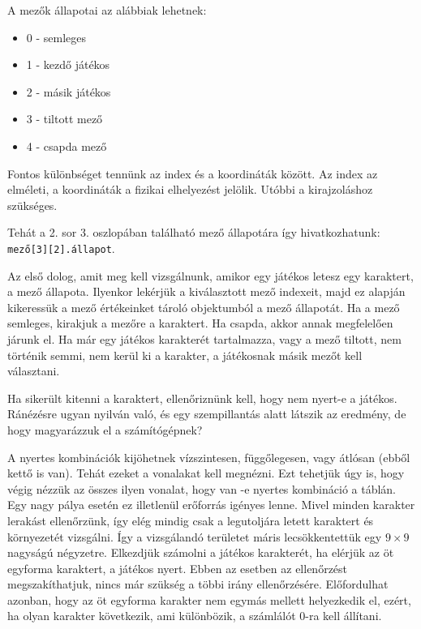 A mezők állapotai az alábbiak lehetnek:
\begin{itemize}	
	\item 0 - semleges
	\item 1 - kezdő játékos
	\item 2 - másik játékos
	\item 3 - tiltott mező
	\item 4 - csapda mező
\end{itemize}

Fontos különbséget tennünk az index és a koordináták között. Az index az elméleti, a koordináták a fizikai elhelyezést jelölik. Utóbbi a kirajzoláshoz szükséges.

Tehát a 2. sor 3. oszlopában található mező állapotára így hivatkozhatunk: \\
\texttt{mező[3][2].állapot}.


Az első dolog, amit meg kell vizsgálnunk, amikor egy játékos letesz egy karaktert, a mező állapota. Ilyenkor lekérjük a kiválasztott mező indexeit, majd ez alapján kikeressük a mező értékeinket tároló objektumból a mező állapotát. Ha a mező semleges, kirakjuk a mezőre a karaktert. Ha csapda, akkor annak megfelelően járunk el. Ha már egy játékos karakterét tartalmazza, vagy a mező tiltott, nem történik semmi, nem kerül ki a karakter, a játékosnak másik mezőt kell választani.

Ha sikerült kitenni a karaktert, ellenőriznünk kell, hogy nem nyert-e a játékos. Ránézésre ugyan nyilván való, és egy szempillantás alatt látszik az eredmény, de hogy magyarázzuk el a számítógépnek?

A nyertes kombinációk kijöhetnek vízszintesen, függőlegesen, vagy átlósan (ebből kettő is van). Tehát ezeket a vonalakat kell megnézni. Ezt tehetjük úgy is, hogy végig nézzük az összes ilyen vonalat, hogy van -e nyertes kombináció a táblán. Egy nagy pálya esetén ez illetlenül erőforrás igényes lenne. Mivel minden karakter lerakást ellenőrzünk, így elég mindig csak a legutoljára letett karaktert és környezetét vizsgálni. Így a vizsgálandó területet máris lecsökkentettük egy $9 \times 9$ nagyságú négyzetre. Elkezdjük számolni a játékos karakterét, ha elérjük az öt egyforma karaktert, a játékos nyert. Ebben az esetben az ellenőrzést megszakíthatjuk, nincs már szükség a többi irány ellenőrzésére. Előfordulhat azonban, hogy az öt egyforma karakter nem egymás mellett helyezkedik el, ezért, ha olyan karakter következik, ami különbözik, a számlálót 0-ra kell állítani.

